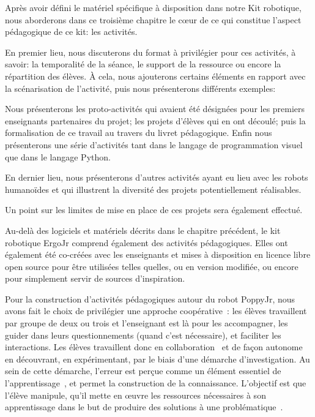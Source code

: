 \label{sec:activite}
\begin{resumChap}
Après avoir défini le matériel spécifique à disposition dans notre Kit robotique, nous aborderons dans ce troisième chapitre le cœur de ce qui constitue l'aspect pédagogique de ce kit: les activités.\par%
En premier lieu, nous discuterons du format à privilégier pour ces activités, à savoir: la temporalité de la séance, le support de la ressource ou encore la répartition des élèves. À cela, nous ajouterons certains éléments en rapport avec la scénarisation de l'activité, puis nous présenterons différents exemples:\par%
Nous présenterons les proto-activités qui avaient été désignées pour les premiers enseignants partenaires du projet; les projets d'élèves qui en ont découlé; puis la formalisation de ce travail au travers du livret pédagogique. Enfin nous présenterons une série d'activités  tant dans le langage de programmation visuel  que dans le langage Python.\par%
En dernier lieu, nous présenterons d'autres activités ayant eu lieu avec les robots humanoïdes et qui illustrent la diversité des projets potentiellement réalisables.\par%
Un point sur les limites de mise en place de ces projets sera également effectué.
\end{resumChap}{}
    Au-delà des logiciels et matériels décrits dans le chapitre précédent, le kit robotique ErgoJr comprend également des activités pédagogiques. Elles ont également été co-créées avec les enseignants et mises à disposition en licence libre open source pour être utilisées telles quelles, ou en version modifiée, ou encore pour simplement servir de sources d'inspiration.\par%
    Pour la construction d’activités pédagogiques autour du robot PoppyJr, nous avons fait le choix de privilégier une approche coopérative~: les élèves travaillent par groupe de deux ou trois et l’enseignant est là pour les accompagner, les guider dans leurs questionnements (quand c’est nécessaire), et faciliter les interactions. Les élèves travaillent donc en collaboration~ et de façon autonome en découvrant, en expérimentant, par le biais d’une démarche d’investigation. Au sein de cette démarche, l’erreur est perçue comme un élément essentiel de l’apprentissage~, et permet la construction de la connaissance. L’objectif est que l’élève manipule, qu’il mette en œuvre les ressources nécessaires à son apprentissage dans le but de produire des solutions à une problématique~.
